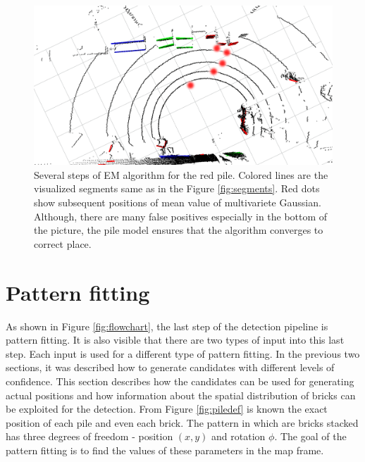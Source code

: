 \begin{figure}[H]
\centering
\includegraphics[scale=0.3]{fig/em_algo.png}
\caption[Em Algorithm in pile detector]{Several steps of EM algorithm for the red pile. Colored lines are the visualized segments same as in the Figure \ref{fig:segments}. Red dots show subsequent positions of mean value of multivariete Gaussian. Although, there are many false positives especially in the bottom of the picture, the pile model ensures that the algorithm converges to correct place.}
\label{fig:em}
\end{figure}


\section{Pattern fitting}
As shown in Figure \ref{fig:flowchart}, the last step of the detection pipeline is pattern fitting. It is also visible that there are two types of input into this last step. Each input is used for a different type of pattern fitting. In the previous two sections, it was described how to generate candidates with different levels of confidence. This section describes how the candidates can be used for generating actual positions and how information about the spatial distribution of bricks can be exploited for the detection. From Figure \ref{fig:piledef} is known the exact position of each pile and even each brick. The pattern in which are bricks stacked has three degrees of freedom - position $(x, y)$ and rotation $\phi$. The goal of the pattern fitting is to find the values of these parameters in the map frame.

